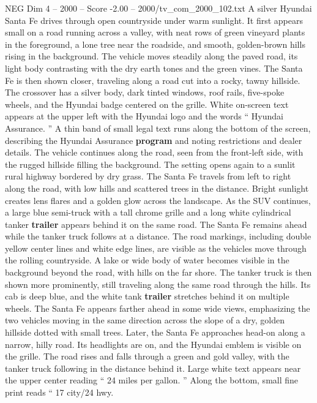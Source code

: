 \begin{textsample}{NEG Dim 4 – 2000 – Score -2.00 – 2000/tv\_com\_2000\_102.txt}  \label{ex:f4_neg_044}
A silver Hyundai Santa Fe drives through open countryside under warm sunlight.
It first appears small on a road running across a valley, with neat rows of green vineyard plants in the foreground, a lone tree near the roadside, and smooth, golden-brown hills rising in the background.
The vehicle moves steadily along the paved road, its light body contrasting with the dry earth tones and the green vines.
The Santa Fe is then shown closer, traveling along a road cut into a rocky, tawny hillside.
The crossover has a silver body, dark tinted windows, roof rails, five-spoke wheels, and the Hyundai badge centered on the grille.
White on-screen text appears at the upper left with the Hyundai logo and the words “ Hyundai Assurance. ” A thin band of small legal text runs along the bottom of the screen, describing the Hyundai Assurance \textbf{program} and noting restrictions and dealer details.
The vehicle continues along the road, seen from the front-left side, with the rugged hillside filling the background.
The setting opens again to a sunlit rural highway bordered by dry grass.
The Santa Fe travels from left to right along the road, with low hills and scattered trees in the distance.
Bright sunlight creates lens flares and a golden glow across the landscape.
As the SUV continues, a large blue semi-truck with a tall chrome grille and a long white cylindrical tanker \textbf{trailer} appears behind it on the same road.
The Santa Fe remains ahead while the tanker truck follows at a distance.
The road markings, including double yellow center lines and white edge lines, are visible as the vehicles move through the rolling countryside.
A lake or wide body of water becomes visible in the background beyond the road, with hills on the far shore.
The tanker truck is then shown more prominently, still traveling along the same road through the hills.
Its cab is deep blue, and the white tank \textbf{trailer} stretches behind it on multiple wheels.
The Santa Fe appears farther ahead in some wide views, emphasizing the two vehicles moving in the same direction across the slope of a dry, golden hillside dotted with small trees.
Later, the Santa Fe approaches head-on along a narrow, hilly road.
Its headlights are on, and the Hyundai emblem is visible on the grille.
The road rises and falls through a green and gold valley, with the tanker truck following in the distance behind it.
Large white text appears near the upper center reading “ 24 miles per gallon. ” Along the bottom, small fine print reads “ 17 city/24 hwy.

\end{textsample}
